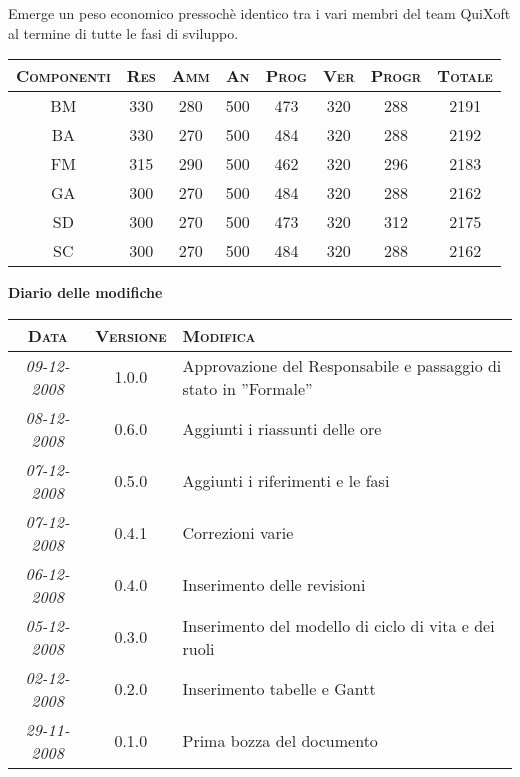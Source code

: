 \documentclass[11pt,a4paper]{article}
\newcommand{\modifiche} 
{
\newpage
\begin{center}
\textbf{Diario delle modifiche} \\
\bigskip
\begin{tabular}{|c|c|p{0.62\textwidth}|}
\hline
\textsc{Data} & \textsc{Versione} & \textsc{Modifica} \\
\hline
\hline
\textit{09-12-2008} & 1.0.0 & Approvazione del Responsabile e passaggio di stato in ''Formale''\\
\hline
\textit{08-12-2008} & 0.6.0 & Aggiunti i riassunti delle ore \\
\hline
\textit{07-12-2008} & 0.5.0 & Aggiunti i riferimenti e le fasi \\
\hline
\textit{07-12-2008} & 0.4.1 & Correzioni varie \\
\hline
\textit{06-12-2008} & 0.4.0 & Inserimento delle revisioni \\
\hline
\textit{05-12-2008} & 0.3.0 & Inserimento del modello di ciclo di vita e dei ruoli \\
\hline
\textit{02-12-2008} & 0.2.0 & Inserimento tabelle e Gantt \\
\hline
\textit{29-11-2008} & 0.1.0 & Prima bozza del documento \\
\hline
\end{tabular}
\end{center}
}
\begin{document}
Emerge un peso economico pressochè identico tra i vari membri del team QuiXoft al termine di tutte le fasi di sviluppo.
\begin{center}
\begin{tabular}{|c||c|c|c|c|c|c||c|}
\hline
\textsc{Componenti} & \textsc{Res} & \textsc{Amm} & \textsc{An} & \textsc{Prog} & \textsc{Ver} & \textsc{Progr} & \textsc{Totale}\\
\hline \hline
BM & 330 & 280 & 500 & 473 & 320 & 288 & 2191\\ \hline
BA & 330 & 270 & 500 & 484 & 320 & 288 & 2192\\ \hline
FM & 315 & 290 & 500 & 462 & 320 & 296 & 2183\\ \hline
GA & 300 & 270 & 500 & 484 & 320 & 288 & 2162\\ \hline
SD & 300 & 270 & 500 & 473 & 320 & 312 & 2175\\ \hline
SC & 300 & 270 & 500 & 484 & 320 & 288 & 2162\\ \hline
\end{tabular}
\end{center}
\modifiche
\end{document}
